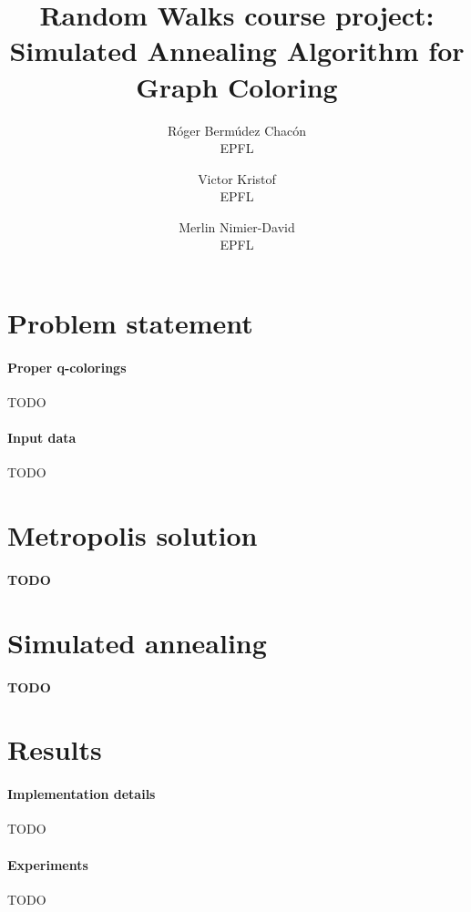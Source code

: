 \documentclass{report}
\title{Random Walks course project: Simulated Annealing Algorithm for Graph Coloring}
\author{
  R\'oger Berm\'udez Chac\'on\\EPFL
  \and
  Victor Kristof\\EPFL
  \and
  Merlin Nimier-David\\EPFL
}
\begin{document}
  \maketitle

  \section*{Problem statement}
  \paragraph{Proper q-colorings}
  TODO

  \paragraph{Input data}
  TODO

  \section*{Metropolis solution}
  \paragraph{TODO}

  \section*{Simulated annealing}
  \paragraph{TODO}

  \section*{Results}
  \paragraph{Implementation details}
  TODO

  \paragraph{Experiments}
  TODO
\end{document}
